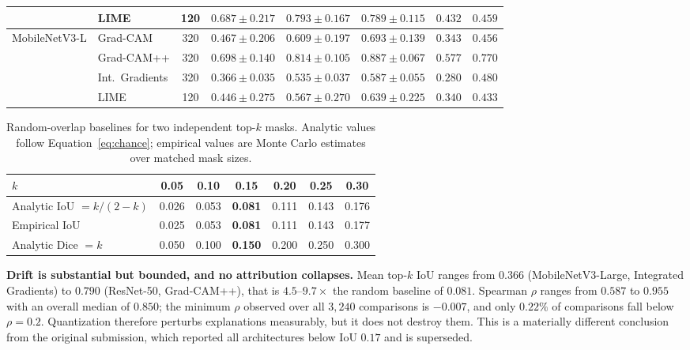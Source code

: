 \documentclass[fleqn,10pt]{wlscirep}
\begin{document}
\begin{table}[!ht]
\begin{tabular}{ll c ccc cc}
 & LIME & 120 & $0.687 \pm 0.217$ & $0.793 \pm 0.167$ & $0.789 \pm 0.115$ & $0.432$ & $0.459$ \\
\midrule
\multirow{4}{*}{MobileNetV3-L}
 & Grad-CAM & 320 & $0.467 \pm 0.206$ & $0.609 \pm 0.197$ & $0.693 \pm 0.139$ & $0.343$ & $0.456$ \\
 & Grad-CAM++ & 320 & $0.698 \pm 0.140$ & $0.814 \pm 0.105$ & $0.887 \pm 0.067$ & $0.577$ & $0.770$ \\
 & Int.\ Gradients & 320 & $0.366 \pm 0.035$ & $0.535 \pm 0.037$ & $0.587 \pm 0.055$ & $0.280$ & $0.480$ \\
 & LIME & 120 & $0.446 \pm 0.275$ & $0.567 \pm 0.270$ & $0.639 \pm 0.225$ & $0.340$ & $0.433$ \\
\bottomrule
\end{tabular}
\end{table}

\begin{table}[!ht]
\centering
\caption{Random-overlap baselines for two independent top-$k$ masks. Analytic values follow Equation~\eqref{eq:chance}; empirical values are Monte Carlo estimates over matched mask sizes.}
\label{tab:chance}
\begin{tabular}{lcccccc}
\toprule
\textbf{$k$} & 0.05 & 0.10 & \textbf{0.15} & 0.20 & 0.25 & 0.30 \\
\midrule
Analytic IoU $= k/(2-k)$ & 0.026 & 0.053 & \textbf{0.081} & 0.111 & 0.143 & 0.176 \\
Empirical IoU & 0.025 & 0.053 & \textbf{0.081} & 0.111 & 0.143 & 0.177 \\
Analytic Dice $= k$ & 0.050 & 0.100 & \textbf{0.150} & 0.200 & 0.250 & 0.300 \\
\bottomrule
\end{tabular}
\end{table}

\textbf{Drift is substantial but bounded, and no attribution collapses.} Mean top-$k$ IoU ranges from $0.366$ (MobileNetV3-Large, Integrated Gradients) to $0.790$ (ResNet-50, Grad-CAM++), that is $4.5$--$9.7\times$ the random baseline of $0.081$. Spearman $\rho$ ranges from $0.587$ to $0.955$ with an overall median of $0.850$; the minimum $\rho$ observed over all $3{,}240$ comparisons is $-0.007$, and only $0.22\%$ of comparisons fall below $\rho = 0.2$. Quantization therefore perturbs explanations measurably, but it does not destroy them. This is a materially different conclusion from the original submission, which reported all architectures below IoU $0.17$ and is superseded.
\end{document}
